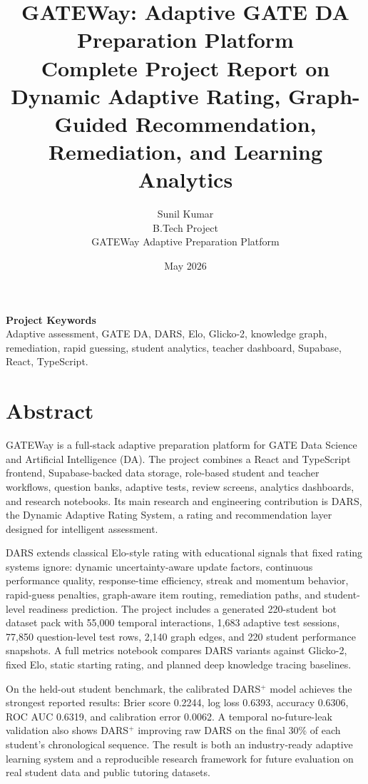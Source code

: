 \documentclass[12pt,a4paper]{report}
\title{
  \vspace{-2cm}
  \textbf{GATEWay: Adaptive GATE DA Preparation Platform}\\
  \large Complete Project Report on Dynamic Adaptive Rating, Graph-Guided Recommendation, Remediation, and Learning Analytics
}
\author{
  Sunil Kumar\\
  B.Tech Project\\
  GATEWay Adaptive Preparation Platform
}
\date{May 2026}
\begin{document}
\maketitle
{}

\begin{center}
\textbf{Project Keywords}\\
Adaptive assessment, GATE DA, DARS, Elo, Glicko-2, knowledge graph, remediation, rapid guessing, student analytics, teacher dashboard, Supabase, React, TypeScript.
\end{center}

\chapter*{Abstract}
GATEWay is a full-stack adaptive preparation platform for GATE Data Science and Artificial Intelligence (DA). The project combines a React and TypeScript frontend, Supabase-backed data storage, role-based student and teacher workflows, question banks, adaptive tests, review screens, analytics dashboards, and research notebooks. Its main research and engineering contribution is DARS, the Dynamic Adaptive Rating System, a rating and recommendation layer designed for intelligent assessment.

DARS extends classical Elo-style rating with educational signals that fixed rating systems ignore: dynamic uncertainty-aware update factors, continuous performance quality, response-time efficiency, streak and momentum behavior, rapid-guess penalties, graph-aware item routing, remediation paths, and student-level readiness prediction. The project includes a generated 220-student bot dataset pack with 55,000 temporal interactions, 1,683 adaptive test sessions, 77,850 question-level test rows, 2,140 graph edges, and 220 student performance snapshots. A full metrics notebook compares DARS variants against Glicko-2, fixed Elo, static starting rating, and planned deep knowledge tracing baselines.

On the held-out student benchmark, the calibrated DARS$^+$ model achieves the strongest reported results: Brier score 0.2244, log loss 0.6393, accuracy 0.6306, ROC AUC 0.6319, and calibration error 0.0062. A temporal no-future-leak validation also shows DARS$^+$ improving raw DARS on the final 30\% of each student's chronological sequence. The result is both an industry-ready adaptive learning system and a reproducible research framework for future evaluation on real student data and public tutoring datasets.
\end{document}

